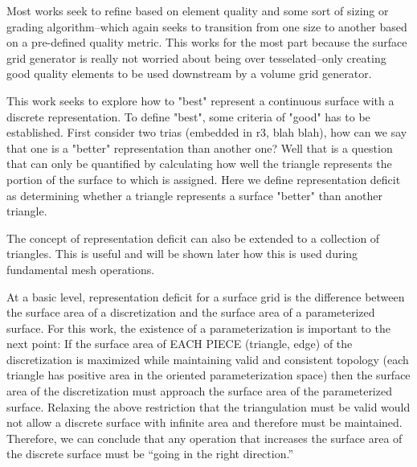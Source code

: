 Most works seek to refine based on element quality and some sort of sizing or grading algorithm--which again seeks to transition from one size to another based on a pre-defined quality metric. This works for the most part because the surface grid generator is really not worried about being over tesselated--only creating good quality elements to be used downstream by a volume grid generator.

This work seeks to explore how to "best" represent a continuous surface with a discrete representation. To define "best", some criteria of "good" has to be established. First consider two trias (embedded in r3, blah blah), how can we say that one is a "better" representation than another one? Well that is a question that can only be quantified by calculating how well the triangle represents the portion of the surface to which is assigned. Here we define representation deficit as determining whether a triangle represents a surface "better" than another triangle.

The concept of representation deficit can also be extended to a collection of triangles. This is useful and will be shown later how this is used during fundamental mesh operations.

At a basic level, representation deficit for a surface grid is the difference between the surface area of a discretization and the surface area of a parameterized surface. For this work, the existence of a parameterization is important to the next point: If the surface area of EACH PIECE (triangle, edge) of the discretization is maximized while maintaining valid and consistent topology (each triangle has positive area in the oriented parameterization space) then the surface area of the discretization must approach the surface area of the parameterized surface. Relaxing the above restriction that the triangulation must be valid would not allow a discrete surface with infinite area and therefore must be maintained. Therefore, we can conclude that any operation that increases the surface area of the discrete surface must be “going in the right direction.”
